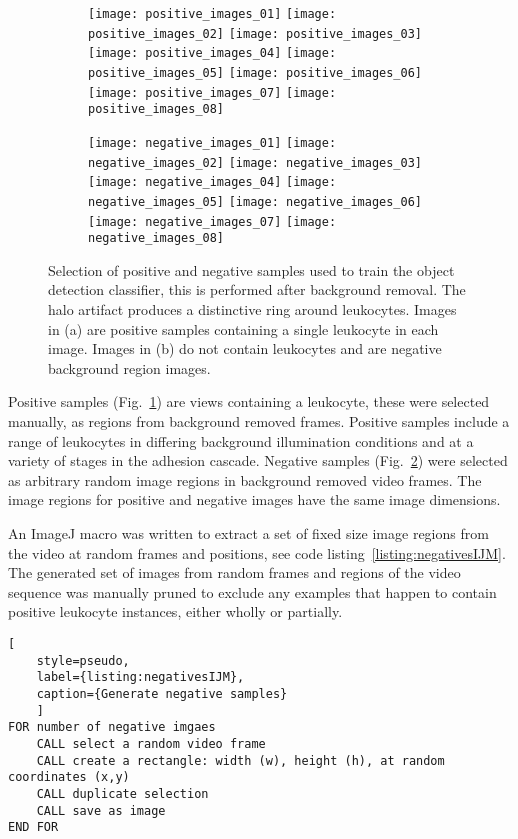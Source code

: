\begin{figure}[htbp]{}
	\begin{subfigure}[b]{\linewidth}
		\centering
		\texttt{[image: positive\_images\_01]}
		\texttt{[image: positive\_images\_02]}
		\texttt{[image: positive\_images\_03]}
		\texttt{[image: positive\_images\_04]}
		\texttt{[image: positive\_images\_05]}
		\texttt{[image: positive\_images\_06]}
		\texttt{[image: positive\_images\_07]}
		\texttt{[image: positive\_images\_08]}
		\caption{}
		\label{positive_images:a}
	\end{subfigure}
	\begin{subfigure}[b]{\linewidth}
		\centering
		\texttt{[image: negative\_images\_01]}
		\texttt{[image: negative\_images\_02]}
		\texttt{[image: negative\_images\_03]}
		\texttt{[image: negative\_images\_04]}
		\texttt{[image: negative\_images\_05]}
		\texttt{[image: negative\_images\_06]}
		\texttt{[image: negative\_images\_07]}
		\texttt{[image: negative\_images\_08]}
		\caption{}
		\label{negative_images:b}
	\end{subfigure}
\caption{Selection of positive and negative samples used to train the object detection classifier, this is performed after background removal. The halo artifact produces a distinctive ring around leukocytes. Images in (a) are positive samples containing a single leukocyte in each image. Images in (b) do not contain leukocytes and are negative background region images.}
\label{figure:classifier_samples}
\end{figure}

Positive samples (Fig.~\ref{positive_images:a}) are views containing a leukocyte, these were selected manually, as regions from background removed frames. Positive samples include a range of leukocytes in differing background illumination conditions and at a variety of stages in the adhesion cascade. Negative samples (Fig.~\ref{negative_images:b}) were selected as arbitrary random image regions in background removed video frames. The image regions for positive and negative images have the same image dimensions. 

An ImageJ macro was written to extract a set of fixed size image regions from the video at random frames and positions, see code listing~\ref{listing:negativesIJM}. The generated set of images from random frames and regions of the video sequence was manually pruned to exclude any examples that happen to contain positive leukocyte instances, either wholly or partially.
\begin{lstlisting}[
	style=pseudo,
	label={listing:negativesIJM},
	caption={Generate negative samples}
	]
FOR number of negative imgaes
	CALL select a random video frame
	CALL create a rectangle: width (w), height (h), at random coordinates (x,y)
	CALL duplicate selection
	CALL save as image
END FOR
\end{lstlisting}

